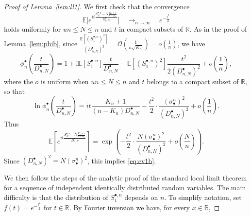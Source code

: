 \documentclass[11pt]{article}
\theoremstyle{definition}
\numberwithin{equation}{section}
\numberwithin{figure}{section}
\numberwithin{table}{section}
\newcommand{\E}{\mathbb{E}}
\newcommand{\R}{\mathbb{R}}
\def\sbn{\sigma_{\bullet}^{n}}
\def\Sbn{S^{\bullet,n}}
\def\phibn{\phi^{\bullet}_{n}}
\def\DbnN{D^{\bullet}_{n,N}}
\newcommand\Es[1]{\mathbb{E}\left[#1\right]}
\begin{document}
\begin{proof}[Proof of Lemma~\ref{lem:ll1}]
We first check that the convergence
\begin{equation}
\label{eq:cv1b}\E\bigg[e^{i t \frac{\Sbn_{N}-N \frac{K_{n}+1}{n-K_{n}} }{ \DbnN }} \bigg]  \quad \mathop{\longrightarrow}_{n \rightarrow \infty} \quad e^{- \frac{t^{2}}{2}}
\end{equation}
holds uniformly for $un \leq N \leq n$ and $t$ in compact subsets of $\R$.  As in the proof of Lemma~\ref{lem:phib}, since $\tfrac{\E[(\Sbn_{1})^{3}]}{(\DbnN)^{3}}=\mathcal O(\tfrac{1}{n \sqrt{K_{n}}})= o(\frac{1}{n})$, we have
\[\phibn\left( \frac{t}{ \DbnN } \right)=1+\textrm{i}\E[\Sbn_{1}] \frac{t}{ \DbnN } - \E[(\Sbn_{1})^{2}] \frac{t^{2}}{2(\DbnN)^{2}}+ o \left( \frac{1}{n} \right),\]
where the $o$ is uniform when $un \leq N \leq n$ and $t$ belongs to a compact subset of $\R$, so that
\[\ln \phibn \left( \frac{t}{ \DbnN } \right)=it  \frac{K_{n}+1}{(n-K_{n})\DbnN} - \frac{t^{2}}{2} \cdot \frac{(\sbn)^{2}}{(\DbnN )^{2}}+ o \left( \frac{1}{n} \right).\]
Thus
\[\Es{e^{i t \frac{\Sbn_{N}-N \frac{K_{n}+1}{n-K_{n}} }{ \DbnN }}}= \exp \left(- \frac{t^{2}}{2} \cdot  \frac{ N (\sbn)^{2} }{(\DbnN)^{2}} + o \left( \frac{N}{n} \right)   \right).\]
Since $(\DbnN)^{2}= N (\sbn)^{2}$, this  implies \eqref{eq:cv1b}.


We then follow the steps of the analytic proof of the standard local limit theorem for a sequence of independent identically distributed random variables. The main difficulty is that the distribution of $\Sbn_{1}$ depends on $n$. To simplify notation, set $f(t)= e^{- \frac{t^{2}}{2}}$ for $t \in \R$. By Fourier inversion we have, for every $x \in \mathbb{R}$,


\end{proof}
\end{document}
